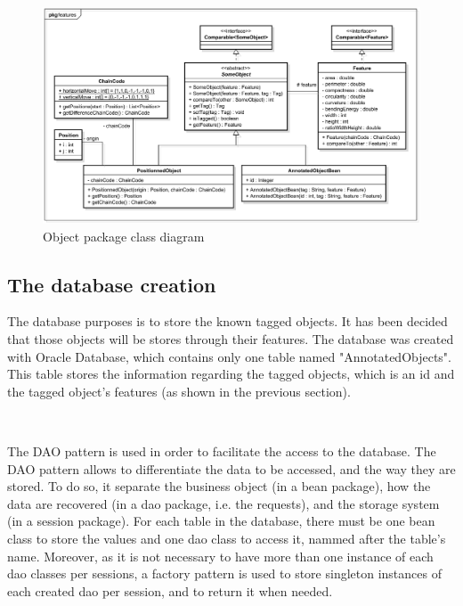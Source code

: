 \begin{figure}[hb]
	\centering 
	\includegraphics[width=1\textwidth]{images/diagrams/class_diagram_objects}
	\caption{Object package class diagram}
	\label{fig:diagram:class:objects}
\end{figure}








\subsection{The database creation}

The database purposes is to store the known tagged objects. It has been decided that those objects will be stores through their features. The database was created with Oracle Database, which contains only one table named "AnnotatedObjects". This table stores the information regarding the tagged objects, which is an id and the tagged object's features (as shown in the previous section).

~~

The \gls{DAO} pattern is used in order to facilitate the access to the database. The \gls{DAO} pattern allows to differentiate the data to be accessed, and the way they are stored. To do so, it separate the business object (in a bean package), how the data are recovered (in a dao package, i.e. the requests), and the storage system (in a session package). For each table in the database, there must be one bean class to store the values and one dao class to access it, nammed after the table's name. Moreover, as it is not necessary to have more than one instance of each dao classes per sessions, a factory pattern is used to store singleton instances of each created dao per session, and to return it when needed.

